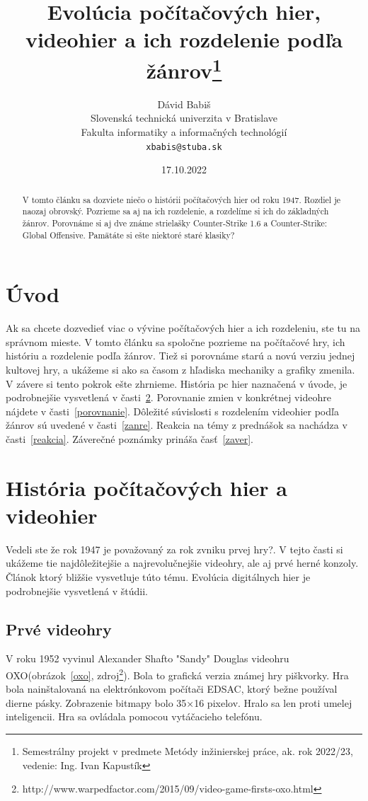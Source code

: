 \documentclass[10pt,oneside,slovak,a4paper]{article}
\title{Evolúcia počítačových hier, videohier a ich rozdelenie podľa žánrov\thanks{Semestrálny projekt v predmete Metódy inžinierskej práce, ak. rok 2022/23, vedenie: Ing. Ivan Kapustík}} %
\author{Dávid Babiš\\[2pt]
	{\small Slovenská technická univerzita v Bratislave}\\
	{\small Fakulta informatiky a informačných technológií}\\
	{\small \texttt{xbabis@stuba.sk}}
	}
\date{\small 17.10.2022}
\begin{document}
\maketitle

\begin{abstract}
 V tomto článku sa dozviete niečo o histórii počítačových hier od roku 1947. Rozdiel je naozaj obrovský. Pozrieme sa aj na ich rozdelenie, a rozdelíme si ich do základných žánrov. Porovnáme si aj dve známe strielašky Counter-Strike 1.6 a Counter-Strike: Global Offensive. Pamätáte si ešte niektoré staré klasiky?
\end{abstract}



\section{Úvod}
Ak sa chcete dozvedieť viac o vývine počítačových hier a ich rozdeleniu, ste tu na správnom mieste. V tomto článku sa spoločne pozrieme na počítačové hry, ich históriu a rozdelenie podľa žánrov. Tiež si porovnáme starú a novú verziu jednej kultovej hry, a ukážeme si ako sa časom z hľadiska mechaniky a grafiky zmenila. V závere si tento pokrok ešte zhrnieme. História pc hier naznačená v úvode, je podrobnejšie vysvetlená v časti~\ref{historia}. Porovnanie zmien v konkrétnej videohre nájdete v časti~\ref{porovnanie}. 
Dôležité súvislosti s rozdelením videohier podľa žánrov sú uvedené v časti~\ref{zanre}. Reakcia na témy z prednášok sa nachádza v časti~\ref{reakcia}. 
Záverečné poznámky prináša časť~\ref{zaver}.

\pagebreak

\section{História počítačových hier a videohier} \label{historia}
Vedeli ste že rok 1947 je považovaný za rok zvniku prvej hry?. V tejto časti si ukážeme tie najdôležitejšie a najrevolučnejšie videohry, ale aj prvé herné konzoly. Článok ktorý bližšie vysvetluje túto tému\cite{Lowood}. Evolúcia digitálnych hier je podrobnejšie vysvetlená v štúdii\cite{sahay}.

\subsection{Prvé videohry}

V roku 1952 vyvinul Alexander Shafto "Sandy" Douglas videohru OXO(obrázok~\ref{oxo}, zdroj\footnote{http://www.warpedfactor.com/2015/09/video-game-firsts-oxo.html}). Bola to grafická verzia známej hry piškvorky. Hra bola nainštalovaná na elektrónkovom počítači EDSAC, ktorý bežne používal dierne pásky. Zobrazenie bitmapy bolo 35×16 pixelov. Hralo sa len proti umelej inteligencii. Hra sa ovládala pomocou vytáčacieho telefónu.
\end{document}
